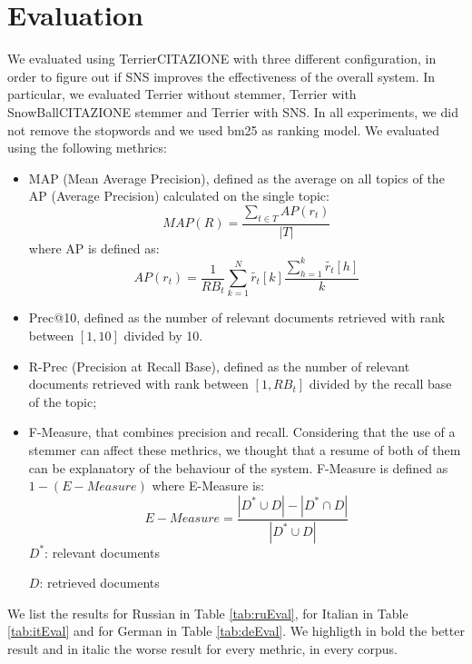 \section{Evaluation}
We evaluated using TerrierCITAZIONE with three different configuration, in order to figure out if SNS improves the effectiveness of the overall system. In particular, we evaluated Terrier without stemmer, Terrier with SnowBallCITAZIONE stemmer and Terrier with SNS. In all experiments, we did not remove the stopwords and we used bm25 as ranking model. We evaluated using the following methrics:

\begin{itemize}
\item MAP (Mean Average Precision), defined as the average on all topics of the AP (Average Precision) calculated on the single topic:
\begin{equation}
MAP(R) = \frac{\sum_{t \in T}AP(r_t)}{|T|}
\end{equation}
where AP is defined as:
\begin{equation}
AP(r_t)=\frac{1}{RB_t}\sum_{k=1}^{N}\widetilde{r_t}[k]\frac{\sum_{h=1}^{k}\widetilde{r_t}[h]}{k}
\end{equation}

\item Prec@10, defined as the number of relevant documents retrieved with rank between $[1, 10]$ divided by 10.

\item R-Prec (Precision at Recall Base), defined as the number of relevant documents retrieved with rank between $[1,RB_t]$ divided by the recall base of the topic;

\item F-Measure, that combines precision and recall. Considering that the use of a stemmer can affect these methrics, we thought that a resume of both of them can be explanatory of the behaviour of the system. F-Measure is defined as $1 - (E-Measure)$ where E-Measure is:
\begin{equation}
E-Measure=\frac{|D^{*}\cup D|-|D^{*}\cap D|}{|D^{*}\cup D|}
\end{equation}
$D^{*}$: relevant documents

$D$: retrieved documents

\end{itemize}

We list the results for Russian in Table \ref{tab:ruEval}, for Italian in Table \ref{tab:itEval} and for German in Table \ref{tab:deEval}. We highligth in bold the better result and in italic the worse result for every methric, in every corpus.


